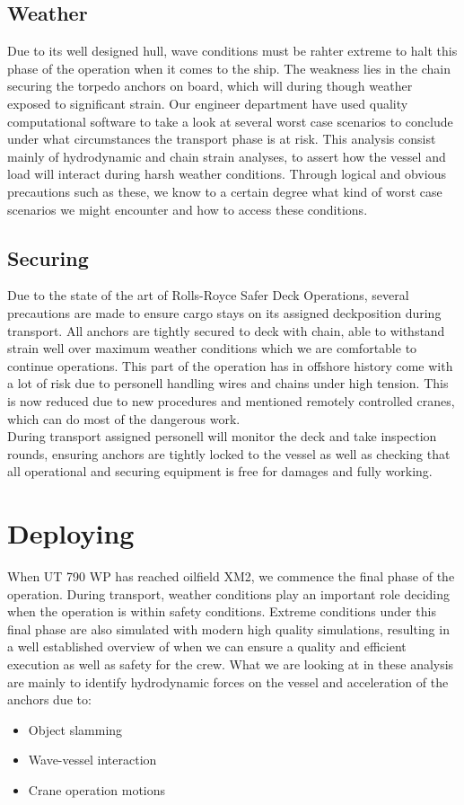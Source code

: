 \documentclass[a4paper,norsk]{article}
\begin{document}
\subsection*{Weather}
Due to its well designed hull, wave conditions must be rahter extreme to halt this phase of the operation when it comes to the ship. The weakness lies in the chain securing the torpedo anchors on board, which will during though weather exposed to significant strain. Our engineer department have used quality computational software to take a look at several worst case scenarios to conclude under what circumstances the transport phase is at risk. This analysis consist mainly of hydrodynamic and chain strain analyses, to assert how the vessel and load will interact during harsh weather conditions. Through logical and obvious precautions such as these, we know to a certain degree what kind of worst case scenarios we might encounter and how to access these conditions. 

\subsection*{Securing}
Due to the state of the art of Rolls-Royce Safer Deck Operations, several precautions are made to ensure cargo stays on its assigned deckposition during transport. All anchors are tightly secured to deck with chain, able to withstand strain well over maximum weather conditions which we are comfortable to continue operations. This part of the operation has in offshore history come with a lot of risk due to personell handling wires and chains under high tension. This is now reduced due to new procedures and mentioned remotely controlled cranes, which can do most of the dangerous work.\\
During transport assigned personell will monitor the deck and take inspection rounds, ensuring anchors are tightly locked to the vessel as well as checking that all operational and securing equipment is free for damages and fully working. 

\newpage
\section*{Deploying}
When UT 790 WP has reached oilfield XM2, we commence the final phase of the operation. During transport, weather conditions play an important role deciding when the operation is within safety conditions. Extreme conditions under this final phase are also simulated with modern high quality simulations, resulting in a well established overview of when we can ensure a quality and efficient execution as well as safety for the crew. What we are looking at in these analysis are mainly to identify hydrodynamic forces on the vessel and acceleration of the anchors due to:
\begin{itemize}
\item Object slamming
\item Wave-vessel interaction
\item Crane operation motions
\end{itemize}
\end{document}
